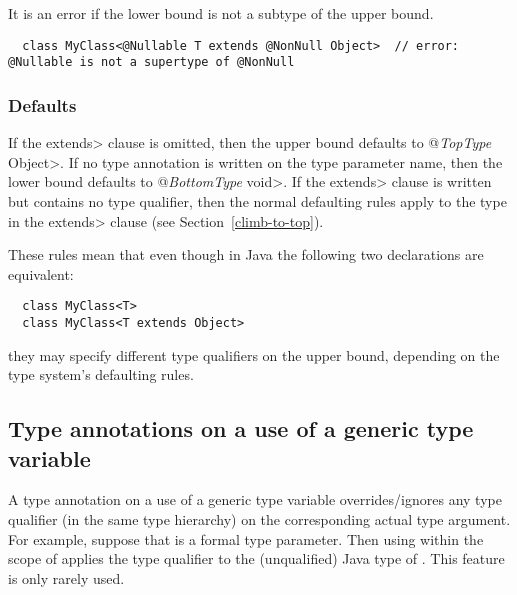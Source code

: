 It is an error if the lower bound is not a subtype of the upper bound.

\begin{smaller}
\begin{Verbatim}
  class MyClass<@Nullable T extends @NonNull Object>  // error: @Nullable is not a supertype of @NonNull
\end{Verbatim}
\end{smaller}


\subsubsection{Defaults\label{generics-defaults}}
If the \<extends> clause is omitted,
then the upper bound defaults to \<@\emph{TopType} Object>.
If no type annotation is written on the type parameter name,
then the lower bound defaults to \<@\emph{BottomType} void>.
If the \<extends> clause is written but contains no type qualifier,
then the normal defaulting rules apply to the type in the \<extends>
clause (see Section~\ref{climb-to-top}).

These rules mean that even though in Java the following two declarations
are equivalent:

\begin{Verbatim}
  class MyClass<T>
  class MyClass<T extends Object>
\end{Verbatim}

\noindent
they may specify different type qualifiers on the upper bound, depending on
the type system's defaulting rules.



\subsection{Type annotations on a use of a generic type variable\label{type-variable-use}}

A type annotation on a use of a generic type variable overrides/ignores any type
qualifier (in the same type hierarchy) on the corresponding actual type
argument.  For example, suppose that  is a formal type parameter.
Then using  within the scope of  applies the type
qualifier  to the (unqualified) Java type of \@.
This feature is only rarely used.

